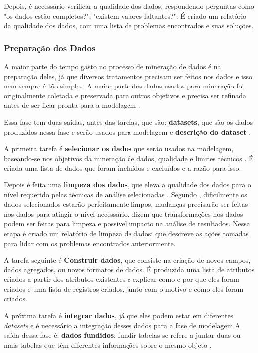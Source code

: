 Depois, é necessário verificar a qualidade dos dados, respondendo perguntas como "os dados estão completos?", "existem valores faltantes?". É criado um relatório da qualidade dos dados, com uma lista de problemas encontrados e suas soluções.

\subsubsection{Preparação dos Dados}
A maior parte do tempo gasto no processo de mineração de dados é na preparação deles, já que diversos tratamentos precisam ser feitos nos dados e isso nem sempre é tão simples. A maior parte dos dados usados para mineração foi originalmente coletada e preservada para outros objetivos e precisa ser refinada antes de ser ficar pronta para a modelagem \citep{dmfd}.

Essa fase tem duas saídas, antes das tarefas, que são: \textbf{datasets}, que são os dados produzidos nessa fase e serão usados para modelagem e \textbf{descrição do dataset} \citep{crispmanual}.

A primeira tarefa é \textbf{selecionar os dados} que serão usados na modelagem, baseando-se nos objetivos da mineração de dados, qualidade e limites técnicos \citep{crispmanual}. É criada uma lista de dados que foram incluídos e excluídos e a razão para isso.

Depois é feita uma \textbf{limpeza dos dados}, que eleva a qualidade dos dados para o nível requerido pelas técnicas de análise selecionadas \citep{crispmanual}. Segundo , dificilmente os dados selecionados estarão perfeitamente limpos, mudanças precisarão ser feitas nos dados para atingir o nível necessário.  dizem que transformações nos dados podem ser feitas para limpeza e possível impacto na análise de resultados. Nessa etapa é criado um relatório de limpeza de dados: que descreve as ações tomadas para lidar com os problemas encontrados anteriormente.

A tarefa seguinte é \textbf{Construir dados}, que consiste na criação de novos campos, dados agregados, ou novos formatos de dados. É produzida uma lista de atributos criados a partir dos atributos existentes e explicar como e por que eles foram criados e uma lista de registros criados, junto com o motivo e como eles foram criados.

A próxima tarefa é \textbf{integrar dados}, já que eles podem estar em diferentes \textit{datasets} e é necessário a integração desses dados para a fase de modelagem.A saída dessa fase é: \textbf{dados fundidos}: fundir tabelas se refere a juntar duas ou mais tabelas que têm diferentes informações sobre o mesmo objeto \citep{crispmanual}. 

